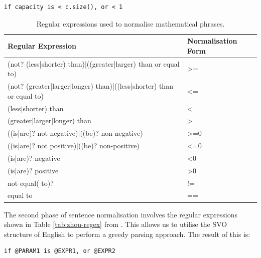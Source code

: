 \begin{verbatim}
if capacity is < c.size(), or < 1
\end{verbatim}

\begin{table}[h]
	\begin{tabular}{|l|l|}
		\hline
		\textbf{Regular Expression} & \textbf{Normalisation Form} \\ \hline
		(not? (less|shorter) than)|((greater|larger) than or equal to) & \textgreater{}= \\ \hline
		(not? (greater|larger|longer) than)|((less|shorter) than or equal to) & \textless{}= \\ \hline
		(less|shorter) than & \textless{} \\ \hline
		(greater|larger|longer) than & \textgreater{} \\ \hline
		((is|are)? not negative)|((be)? non-negative) & \textgreater{}=0 \\ \hline
		((is|are)? not positive)|((be)? non-positive) & \textless{}=0 \\ \hline
		(is|are)? negative & \textless{}0 \\ \hline
		(is|are)? positive & \textgreater{}0 \\ \hline
		not equal( to)? & != \\ \hline
		equal to & == \\ \hline
	\end{tabular}
	\caption{Regular expressions used to normalise mathematical phrases.}
	\label{tab:normalisation-regex}
\end{table}

The second phase of sentence normalisation involves the regular expressions shown in Table \ref{tab:zhou-regex} from \cite{zhou-directive}. This allows us to utilise the SVO structure of English to perform a greedy parsing approach. The result of this is:

\begin{verbatim}
if @PARAM1 is @EXPR1, or @EXPR2
\end{verbatim}

